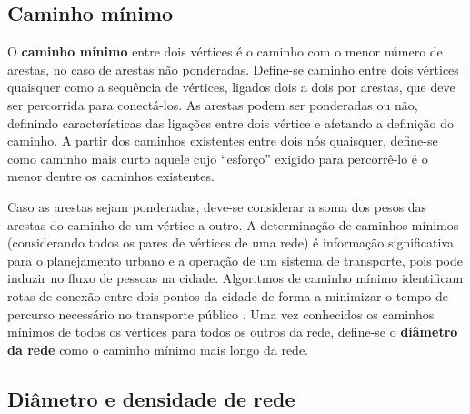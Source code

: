 \subsection{Caminho mínimo}

O {\bf caminho mínimo} entre dois vértices é o caminho com o menor número de arestas, no caso de arestas não ponderadas. 
Define-se caminho entre dois vértices quaisquer como a sequência de vértices, ligados dois a dois por arestas, que deve ser percorrida para conectá-los. As arestas podem ser ponderadas ou não, definindo características das ligações entre dois vértice e afetando a definição do caminho. A partir dos caminhos existentes entre dois nós quaisquer, define-se como caminho mais curto aquele cujo ``esforço'' exigido para percorrê-lo é o menor dentre os caminhos existentes.

Caso as arestas sejam ponderadas, deve-se considerar a soma dos pesos das arestas do caminho de um vértice a outro. A determinação de caminhos mínimos (considerando todos os pares de vértices de uma rede) é informação significativa para o planejamento urbano e a operação de um sistema de transporte, pois pode induzir no fluxo de pessoas na cidade. Algoritmos de caminho mínimo identificam rotas de conexão entre dois pontos da cidade de forma a minimizar o tempo de percurso necessário no transporte público \cite{Mart:2009, Larson:81}. Uma vez conhecidos os caminhos mínimos de todos os vértices para todos os outros da rede, define-se o {\bf diâmetro da rede} como o caminho mínimo mais longo da rede.



\subsection{Diâmetro e densidade de rede}

